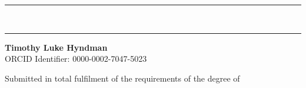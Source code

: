 \documentclass[11pt, oneside]{Thesis} %
\begin{document}
\begin{titlepage}
\begin{center}


\rule{\linewidth}{0.5mm}\\[0.4cm]
{\huge \bfseries \ttitle} %
\vspace*{0.4cm}
\rule{\linewidth}{0.5mm}
 
\LARGE
\textbf{Timothy Luke Hyndman}\\
\large
ORCID Identifier: 0000-0002-7047-5023

\vspace{100pt}

 
\LARGE Submitted in total fulfilment of the requirements of the degree of \degreename\\[0.3cm] %
{\large \monthyear}\\[4cm] %

\vspace*{\fill}
\textsc{\LARGE \deptname}\\ %
\textsc{\LARGE \univname}\\[1.5cm] %
 

 
\vfill
\end{center}
\end{titlepage}
\end{document}
